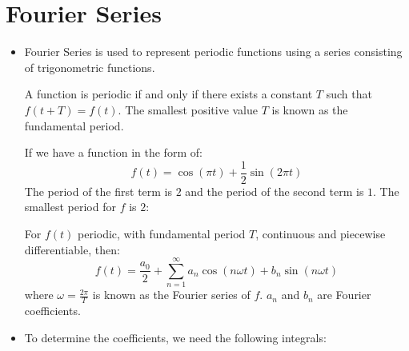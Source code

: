\section{Fourier Series}
\begin{itemize}
    \item Fourier Series is used to represent periodic functions using a series consisting of trigonometric functions.
    \begin{definition}
        A function is periodic if and only if there exists a constant $T$ such that $f(t+T)=f(t)$. The smallest positive value $T$ is known as the fundamental period.
    \end{definition} 
    \begin{example}
        If we have a function in the form of: 
        \begin{equation}
            f(t) = \cos(\pi t) + \frac{1}{2}\sin(2\pi t)
            \label{eqn:fourier}
        \end{equation}
        The period of the first term is $2$ and the period of the second term is $1$. The smallest period for $f$ is $2$:
\begin{example}
\end{example}
    \end{example}
    \begin{theorem}
        For $f(t)$ periodic, with fundamental period $T$, continuous and piecewise differentiable, then:
        \begin{equation}
            f(t)=\frac{a_0}{2}+\sum_{n=1}^\infty a_n\cos (n\omega t) + b_n\sin(n\omega t)
        \end{equation}
        where $\omega = \frac{2\pi}{T}$ is known as the Fourier series of $f$. $a_n$ and $b_n$ are Fourier coefficients.
    \end{theorem}
    \item To determine the coefficients, we need the following integrals:

\end{itemize}
